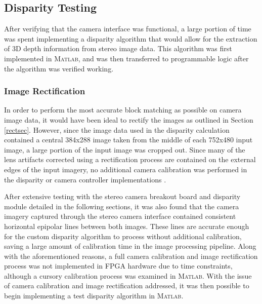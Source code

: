 \subsection{Disparity Testing}
After verifying that the camera interface was functional, a large portion of time was spent implementing a disparity algorithm that would allow for the extraction of 3D depth information from stereo image data. This algorithm was first implemented in \textsc{Matlab}, and was then transferred to programmable logic after the algorithm was verified working. 

\subsubsection{Image Rectification}
In order to perform the most accurate block matching as possible on camera image data, it would have been ideal to rectify the images as outlined in Section \ref{rectsec}. However, since the image data used in the disparity calculation contained a central 384x288 image taken from the middle of each 752x480 input image, a large portion of the input image was cropped out. Since many of the lens artifacts corrected using a rectification process are contained on the external edges of the input imagery, no additional camera calibration was performed in the disparity or camera controller implementations \cite{collins}. 
\par
After extensive testing with the stereo camera breakout board and disparity module detailed in the following sections, it was also found that the camera imagery captured through the stereo camera interface contained consistent horizontal epipolar lines between both images. These lines are accurate enough for the custom disparity algorithm to process without additional calibration, saving a large amount of calibration time in the image processing pipeline. Along with the aforementioned reasons, a full camera calibration and image rectification process was not implemented in FPGA hardware due to time constraints, although a cursory calibration process was examined in \textsc{Matlab}. With the issue of camera calibration and image rectification addressed, it was then possible to begin implementing a test disparity algorithm in \textsc{Matlab}.

